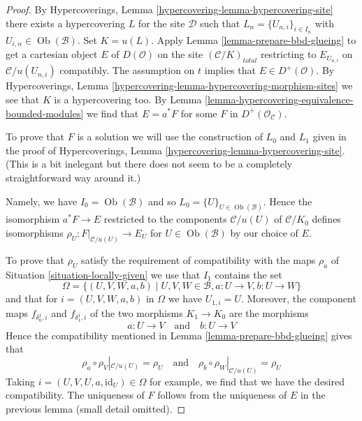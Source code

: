 \documentclass{stacks-project}
\theoremstyle{plain}
\theoremstyle{definition}
\theoremstyle{remark}
\numberwithin{equation}{subsection}
\def\Ob{\mathop{\mathrm{Ob}}\nolimits}
\begin{document}
\begin{proof}
By Hypercoverings, Lemma \ref{hypercovering-lemma-hypercovering-site}
there exists a hypercovering $L$ for the site $\mathcal{D}$ such that
$L_n = \{U_{n, i}\}_{i \in I_n}$ with $U_{i, n} \in \Ob(\mathcal{B})$.
Set $K = u(L)$. Apply Lemma \ref{lemma-prepare-bbd-glueing}
to get a cartesian object $E$ of $D(\mathcal{O})$ on the site
$(\mathcal{C}/K)_{total}$ restricting to $E_{U_{n, i}}$ on
$\mathcal{C}/u(U_{n, i})$ compatibly.
The assumption on $t$ implies that $E \in D^+(\mathcal{O})$.
By Hypercoverings, Lemma \ref{hypercovering-lemma-hypercovering-morphism-sites}
we see that $K$ is a hypercovering too.
By Lemma \ref{lemma-hypercovering-equivalence-bounded-modules}
we find that $E = a^*F$ for some $F$ in $D^+(\mathcal{O}_\mathcal{C})$.

\medskip\noindent
To prove that $F$ is a solution we will use the construction of
$L_0$ and $L_1$ given in the proof of
Hypercoverings, Lemma \ref{hypercovering-lemma-hypercovering-site}.
(This is a bit inelegant but there does not seem to be a completely
straightforward way around it.)

\medskip\noindent
Namely, we have $I_0 = \Ob(\mathcal{B})$ and so
$L_0 = \{U\}_{U \in \Ob(\mathcal{B})}$.
Hence the isomorphism $a^*F \to E$ restricted to the components
$\mathcal{C}/u(U)$ of $\mathcal{C}/K_0$ defines isomorphisms
$\rho_U : F|_{\mathcal{C}/u(U)} \to E_U$ for $U \in \Ob(\mathcal{B})$
by our choice of $E$.

\medskip\noindent
To prove that $\rho_U$ satisfy the requirement of compatibility
with the maps $\rho_a$ of Situation \ref{situation-locally-given}
we use that $I_1$ contains the set
$$
\Omega =
\{(U, V, W, a, b) \mid U, V, W \in \mathcal{B}, a : U \to V, b : U \to W\}
$$
and that for $i = (U, V, W, a, b)$ in $\Omega$ we have
$U_{1, i} = U$. Moreover, the component maps $f_{\delta^1_0, i}$ and
$f_{\delta^1_1, i}$ of the two morphisms $K_1 \to K_0$ are the morphisms
$$
a : U \to V \quad\text{and}\quad b : U \to V
$$
Hence the compatibility mentioned in
Lemma \ref{lemma-prepare-bbd-glueing} gives that
$$
\rho_a \circ \rho_V|_{\mathcal{C}/u(U)} = \rho_U
\quad\text{and}\quad
\rho_b \circ \rho_W|_{\mathcal{C}/u(U)} = \rho_U
$$
Taking $i = (U, V, U, a, \text{id}_U) \in \Omega$ for example, we find
that we have the desired compatibility. The uniqueness of $F$ follows
from the uniqueness of $E$ in the previous lemma (small detail omitted).
\end{proof}
\end{document}
